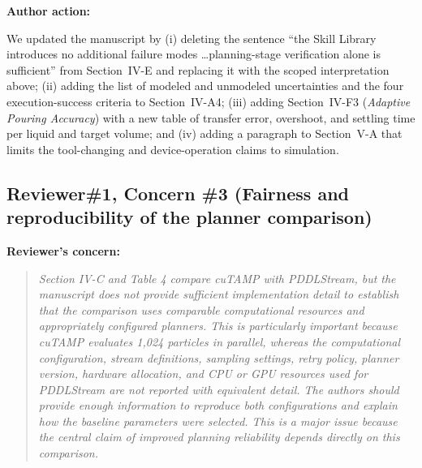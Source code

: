 \documentclass[11pt]{article}
\newif\ifshowstatus
\newcommand{\statusline}[2]{\ifshowstatus\par\noindent\textcolor{status#1}{\textbf{Status: \MakeUppercase{#1}.} #2}\par\smallskip\fi}
\newenvironment{concern}[3][pending]{\subsection*{\ifshowstatus\textcolor{status#1}{#2}\else#2\fi}\statusline{#1}{#3}\textbf{Reviewer's concern:}\begin{quote}\itshape}{\end{quote}}
\newenvironment{action}{\textbf{Author action:}\par\smallskip}{\par\bigskip\noindent\hrulefill\par\bigskip}
\begin{document}
\begin{action}
We updated the manuscript by
(i) deleting the sentence ``the Skill Library introduces no additional failure modes \ldots planning-stage verification alone is sufficient'' from Section~IV-E and replacing it with the scoped interpretation above;
(ii) adding the list of modeled and unmodeled uncertainties and the four execution-success criteria to Section~IV-A4;
(iii) adding Section~IV-F3 (\emph{Adaptive Pouring Accuracy}) with a new table of transfer error, overshoot, and settling time per liquid and target volume;
and (iv) adding a paragraph to Section~V-A that limits the tool-changing and device-operation claims to simulation.
\end{action}

\begin{concern}[pending]{Reviewer\#1, Concern \#3 (Fairness and reproducibility of the planner comparison)}{Needs planner settings, commit hashes, and the tuning-set record from C (no experiment); B9 (256-particle ablation) is optional.}
Section IV-C and Table 4 compare cuTAMP with PDDLStream, but the manuscript does not provide sufficient implementation detail to establish that the comparison uses comparable computational resources and appropriately configured planners.
This is particularly important because cuTAMP evaluates 1,024 particles in parallel, whereas the computational configuration, stream definitions, sampling settings, retry policy, planner version, hardware allocation, and CPU or GPU resources used for PDDLStream are not reported with equivalent detail.
The authors should provide enough information to reproduce both configurations and explain how the baseline parameters were selected.
This is a major issue because the central claim of improved planning reliability depends directly on this comparison.
\end{concern}
\end{document}
